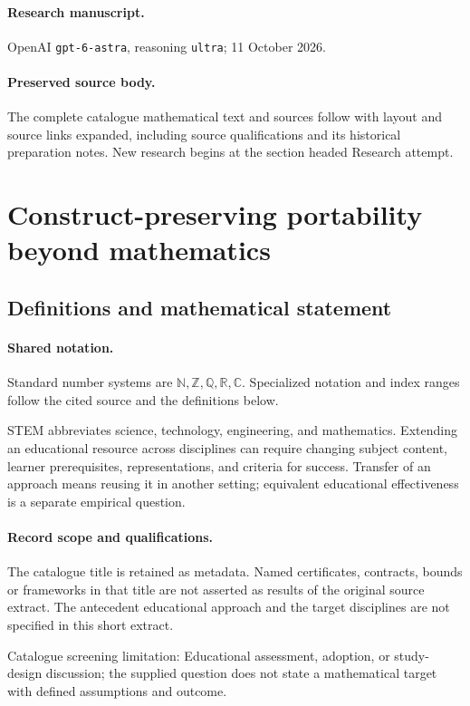 \documentclass[11pt]{article}
\begin{document}
\paragraph{Research manuscript.} OpenAI \texttt{gpt-6-astra}, reasoning \texttt{ultra}; 11 October 2026.
\paragraph{Preserved source body.} The complete catalogue mathematical text and sources follow with layout and source links expanded, including source qualifications and its historical preparation notes. New research begins at the section headed Research attempt.

\section{Construct-preserving portability beyond mathematics}\label{statement}

\subsection{Definitions and mathematical statement}

\paragraph{Shared notation.}Standard number systems are $\mathbb N,\mathbb Z,\mathbb Q,\mathbb R,\mathbb C$. Specialized notation and index ranges follow the cited source and the definitions below.


STEM abbreviates science, technology, engineering, and mathematics. Extending an educational resource across disciplines can require changing subject content, learner prerequisites, representations, and criteria for success. Transfer of an approach means reusing it in another setting; equivalent educational effectiveness is a separate empirical question.
\paragraph{Record scope and qualifications.}
The catalogue title is retained as metadata. Named certificates, contracts, bounds or frameworks in that title are not asserted as results of the original source extract.
The antecedent educational approach and the target disciplines are not specified in this short extract.

Catalogue screening limitation: Educational assessment, adoption, or study-design discussion; the supplied question does not state a mathematical target with defined assumptions and outcome.
\end{document}
